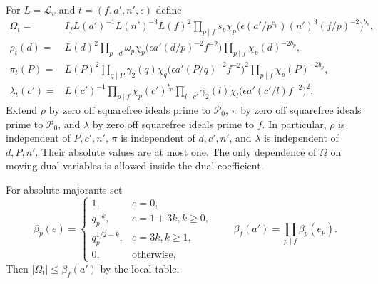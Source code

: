 \documentclass[11pt,a4paper]{article}
\numberwithin{equation}{section}
\theoremstyle{definition}
\theoremstyle{remark}
\begin{document}
For $L=\mathcal L_\upsilon$ and $t=(f,a',n',\epsilon)$ define
\begin{align}
 \Omega_t={}&I_f L(a')^{-1}L(n')^{-3}L(f)^2
   \prod_{p\mid f}s_p
    \chi_p\bigl(\epsilon(a'/p^{e_p})(n')^3(f/p)^{-2}\bigr)^{b_p},
       \label{eq:marked-Omega}\\
 \rho_t(d)={}&L(d)^2
   \prod_{p\mid d}\omega_p
       \chi_p\bigl(\epsilon a'(d/p)^{-2}f^{-2}\bigr)
   \prod_{p\mid f}\chi_p(d)^{-2b_p},\label{eq:marked-rho}\\
 \pi_t(P)={}&L(P)^2
   \prod_{q\mid P}\gamma_2(q)
       \chi_q\bigl(\epsilon a'(P/q)^{-2}f^{-2}\bigr)^2
   \prod_{p\mid f}\chi_p(P)^{-2b_p},\label{eq:marked-pi}\\
 \lambda_t(c')={}&L(c')^{-1}
   \prod_{p\mid f}\chi_p(c')^{b_p}
   \prod_{l\mid c'}\gamma_2(l)
       \chi_l\bigl(\epsilon a'(c'/l)f^{-2}\bigr)^2.
       \label{eq:marked-lambda}
\end{align}
Extend $\rho$ by zero off squarefree ideals prime to $\mathcal P_0$,
$\pi$ by zero off squarefree ideals prime to $\mathcal P_0$,
and $\lambda$ by zero off squarefree ideals prime to $f$.
In particular, $\rho$ is independent of $P,c',n'$,
$\pi$ is independent of $d,c',n'$, and $\lambda$ is independent of
$d,P,n'$.  Their absolute values are at most one.
The only dependence of $\Omega$ on moving dual variables is allowed
inside the dual coefficient.

For absolute majorants set
\begin{equation}\label{eq:frozen-beta}
 \beta_p(e)=
 \begin{cases}
 1,&e=0,\\ q_p^{-k},&e=1+3k,	k\ge0,\\
 q_p^{1/2-k},&e=3k,	k\ge1,\\0,&\text{otherwise},
 \end{cases}
 \qquad \beta_f(a')=\prod_{p\mid f}\beta_p(e_p).
\end{equation}
Then $|\Omega_t|\le\beta_f(a')$ by the local table.
\end{document}
